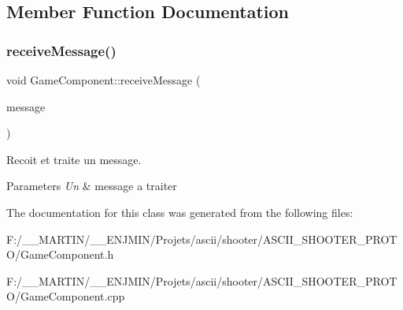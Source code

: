 \subsection{Member Function Documentation}
\hypertarget{class_game_component_a449c4a683e9bb42e0ab939a06e7b0640}{}\label{class_game_component_a449c4a683e9bb42e0ab939a06e7b0640} 
\subsubsection{\texorpdfstring{receive\+Message()}{receiveMessage()}}
{\footnotesize\ttfamily void Game\+Component\+::receive\+Message (\begin{DoxyParamCaption}\item[{G\+O\+Message}]{message }\end{DoxyParamCaption})\hspace{0.3cm}{\ttfamily [virtual]}}



Recoit et traite un message. 


\begin{DoxyParams}{Parameters}
{\em Un} & message a traiter \\
\hline
\end{DoxyParams}


The documentation for this class was generated from the following files\+:\begin{DoxyCompactItemize}
\item 
F\+:/\+\_\+\+\_\+\+M\+A\+R\+T\+I\+N/\+\_\+\+\_\+\+E\+N\+J\+M\+I\+N/\+Projets/ascii/shooter/\+A\+S\+C\+I\+I\+\_\+\+S\+H\+O\+O\+T\+E\+R\+\_\+\+P\+R\+O\+T\+O/Game\+Component.\+h\item 
F\+:/\+\_\+\+\_\+\+M\+A\+R\+T\+I\+N/\+\_\+\+\_\+\+E\+N\+J\+M\+I\+N/\+Projets/ascii/shooter/\+A\+S\+C\+I\+I\+\_\+\+S\+H\+O\+O\+T\+E\+R\+\_\+\+P\+R\+O\+T\+O/Game\+Component.\+cpp\end{DoxyCompactItemize}
